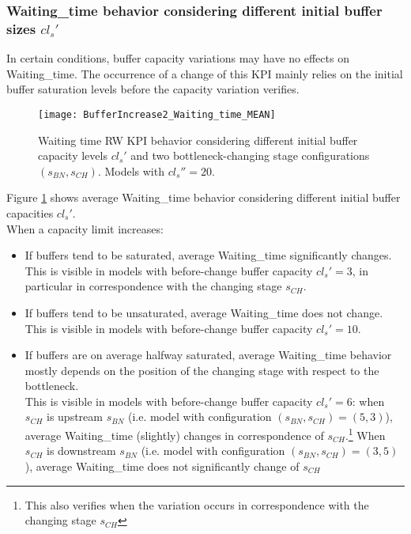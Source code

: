 \subsubsection{Waiting\_time behavior considering different initial buffer sizes $cl_s'$}
In certain conditions, buffer capacity variations may have no effects on Waiting\_time. The occurrence of a change of this KPI mainly relies on the initial buffer saturation levels before the capacity variation verifies. 
\begin{figure}[h] 
\centering
\texttt{[image: BufferIncrease2\_Waiting\_time\_MEAN]}
\caption[Waiting time RW KPI behavior with different initial buffer capacity levels]{Waiting time RW KPI behavior considering different initial buffer capacity levels $cl_s'$ and two bottleneck-changing stage configurations $(s_{BN},s_{CH})$. Models with $cl_s''=20$.}
\label{fig:Waiting time RW KPI behavior with different initial buffer capacity levels}
\end{figure}
Figure \ref{fig:Waiting time RW KPI behavior with different initial buffer capacity levels} shows average Waiting\_time behavior considering different initial buffer capacities $cl_s'$. \\When a capacity limit increases:
\begin{itemize}
\item If buffers tend to be saturated, average Waiting\_time significantly changes. \\This is visible in models with before-change buffer capacity $cl_s'=3$, in particular in correspondence with the changing stage $s_{CH}$.
\item If buffers tend to be unsaturated, average Waiting\_time does not change. \\This is visible in models with before-change buffer capacity $cl_s'=10$.
\item If buffers are on average halfway saturated, average Waiting\_time behavior mostly depends on the position of the changing stage with respect to the bottleneck. \\This is visible in models with before-change buffer capacity $cl_s'=6$: when $s_{CH}$ is upstream $s_{BN}$ (i.e. model with configuration $(s_{BN},s_{CH})=(5,3)$), average Waiting\_time (slightly) changes in correspondence of $s_{CH}$.\footnote{This also verifies when the variation occurs in correspondence with the changing stage $s_{CH}$} When $s_{CH}$ is downstream $s_{BN}$ (i.e. model with configuration $(s_{BN},s_{CH})=(3,5)$), average Waiting\_time does not significantly change of $s_{CH}$
\end{itemize}
